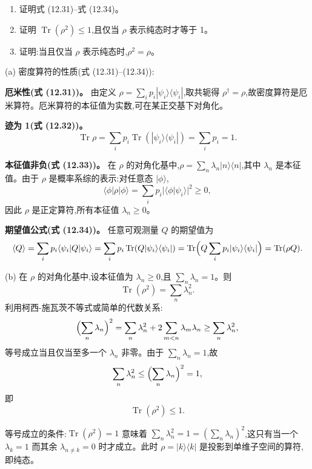 \begin{question}
\begin{enumerate}
\item 证明式 (12.31)--式 (12.34)。
\item 证明 $\operatorname{Tr}(\rho^2)\le 1$,且仅当 $\rho$ 表示纯态时才等于 1。
\item 证明:当且仅当 $\rho$ 表示纯态时,$\rho^2=\rho$。
\end{enumerate}

\par\smallskip
{}

\begin{solution}
(a) 密度算符的性质(式 (12.31)--(12.34)):

\textbf{厄米性(式 (12.31))。} 由定义 $\rho = \sum_i p_i |\psi_i\rangle\langle\psi_i|$,取共轭得 $\rho^\dagger = \rho$,故密度算符是厄米算符。厄米算符的本征值为实数,可在某正交基下对角化。

\textbf{迹为 1(式 (12.32))。}
\[
\operatorname{Tr}\rho = \sum_i p_i \operatorname{Tr}(|\psi_i\rangle\langle\psi_i|) = \sum_i p_i = 1.
\]

\textbf{本征值非负(式 (12.33))。} 在 $\rho$ 的对角化基中,$\rho = \sum_n \lambda_n |n\rangle\langle n|$,其中 $\lambda_n$ 是本征值。由于 $\rho$ 是概率系综的表示:对任意态 $|\phi\rangle$,
\[
\langle\phi|\rho|\phi\rangle = \sum_i p_i |\langle\phi|\psi_i\rangle|^2 \ge 0,
\]
因此 $\rho$ 是正定算符,所有本征值 $\lambda_n \ge 0$。

\textbf{期望值公式(式 (12.34))。} 任意可观测量 $Q$ 的期望值为
\[
\langle Q\rangle = \sum_i p_i \langle\psi_i|Q|\psi_i\rangle
= \sum_i p_i \operatorname{Tr}(Q|\psi_i\rangle\langle\psi_i|)
= \operatorname{Tr}\Bigl(Q\sum_i p_i|\psi_i\rangle\langle\psi_i|\Bigr)
= \operatorname{Tr}(\rho Q).
\]

(b) 在 $\rho$ 的对角化基中,设本征值为 $\lambda_n \ge 0$,且 $\sum_n \lambda_n = 1$。则
\[
\operatorname{Tr}(\rho^2) = \sum_n \lambda_n^2.
\]
利用柯西-施瓦茨不等式或简单的代数关系:
\[
\Bigl(\sum_n \lambda_n\Bigr)^2 = \sum_n \lambda_n^2 + 2\sum_{m<n} \lambda_m\lambda_n \ge \sum_n \lambda_n^2,
\]
等号成立当且仅当至多一个 $\lambda_n$ 非零。由于 $\sum_n \lambda_n = 1$,故
\[
\sum_n \lambda_n^2 \le \Bigl(\sum_n \lambda_n\Bigr)^2 = 1,
\]
即
\[
\boxed{\operatorname{Tr}(\rho^2) \le 1.}
\]

等号成立的条件:$\operatorname{Tr}(\rho^2)=1$ 意味着 $\sum_n \lambda_n^2 = 1 = (\sum_n \lambda_n)^2$,这只有当一个 $\lambda_k = 1$ 而其余 $\lambda_{n\neq k} = 0$ 时才成立。此时 $\rho = |k\rangle\langle k|$ 是投影到单维子空间的算符,即纯态。


\end{solution}
\end{question}
